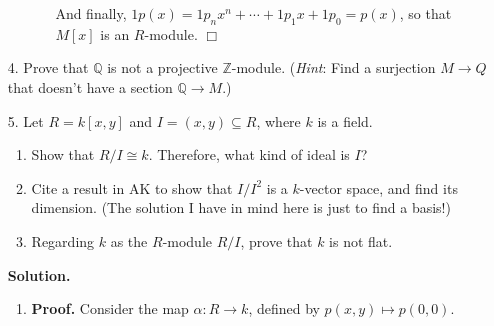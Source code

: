 \documentclass[9pt]{article}
\newcommand{\qed}{\hfill \ensuremath{\Box}}
\newcommand{\Z}{\mathbb{Z}}
\newcommand{\Q}{\mathbb{Q}}
\begin{document}
\begin{enumerate}
\begin{enumerate}
\begin{itemize}
                  And finally, $1p(x) = 1p_nx^n + \cdots + 1p_1x + 1p_0 = p(x)$,
                  so that $M[x]$ is an $R$-module. \qed
               \end{itemize}
      \end{enumerate}
   \item[4.]   Prove that $\Q$ is not a projective $\Z$-module. (\textit{Hint}:
               Find a surjection $M \rightarrow Q$ that doesn't have a section
               $\Q \rightarrow M$.)
   \item[5.]   Let $R = k[x, y]$ and $I = (x, y) \subseteq R$, where $k$ is a
               field.
               \begin{enumerate}
                  \item Show that $R/I \cong k$. Therefore, what kind of ideal
                        is $I$?
                  \item Cite a result in AK to show that $I/I^2$ is a $k$-vector
                        space, and find its dimension. (The solution I have in
                        mind here is just to find a basis!)
                  \item Regarding $k$ as the $R$-module $R/I$, prove that $k$ is
                        not flat.
               \end{enumerate}

      \textbf{Solution.}
      
      \begin{enumerate}
         \item \textbf{Proof.} Consider the map $\alpha : R \rightarrow k$,
               defined by $p(x, y) \mapsto p(0, 0)$.
      \end{enumerate}
\end{enumerate}
\end{document}
